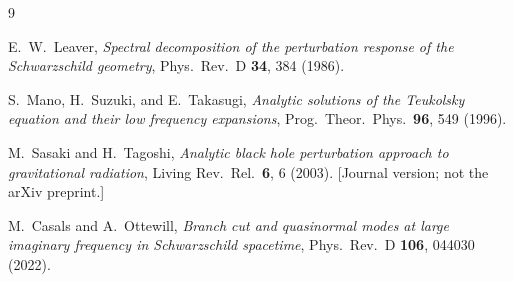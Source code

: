 \documentclass[12pt,a4paper]{article}
\begin{document}
\begin{thebibliography}{9}

  E.~W.~Leaver,
  \textit{Spectral decomposition of the perturbation response of the Schwarzschild geometry},
  Phys.\ Rev.\ D \textbf{34}, 384 (1986).

  S.~Mano, H.~Suzuki, and E.~Takasugi,
  \textit{Analytic solutions of the Teukolsky equation and their low frequency expansions},
  Prog.\ Theor.\ Phys.\ \textbf{96}, 549 (1996).

  M.~Sasaki and H.~Tagoshi,
  \textit{Analytic black hole perturbation approach to gravitational radiation},
  Living Rev.\ Rel.\ \textbf{6}, 6 (2003).
  [Journal version; not the arXiv preprint.]

  M.~Casals and A.~Ottewill,
  \textit{Branch cut and quasinormal modes at large imaginary frequency in Schwarzschild spacetime},
  Phys.\ Rev.\ D \textbf{106}, 044030 (2022).

\end{thebibliography}
\end{document}
